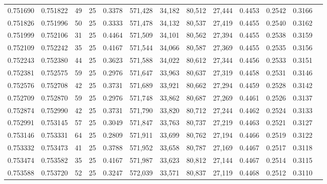 \begin{tabular}{rrrrrrrrrrrrr}
0.751690 & 0.751822 &    49 &  25 &                                     0.3378 & 571,428 &  34,182 &  80,512 &  27,444 & 0.4453 & 0.2542 & 0.3166 \\
0.751826 & 0.751996 &    50 &  25 &                                     0.3333 & 571,478 &  34,132 &  80,537 &  27,419 & 0.4455 & 0.2540 & 0.3162 \\
0.751999 & 0.752106 &    31 &  25 &                                     0.4464 & 571,509 &  34,101 &  80,562 &  27,394 & 0.4455 & 0.2538 & 0.3159 \\
0.752109 & 0.752242 &    35 &  25 &                                     0.4167 & 571,544 &  34,066 &  80,587 &  27,369 & 0.4455 & 0.2535 & 0.3156 \\
0.752243 & 0.752380 &    44 &  25 &                                     0.3623 & 571,588 &  34,022 &  80,612 &  27,344 & 0.4456 & 0.2533 & 0.3151 \\
0.752381 & 0.752575 &    59 &  25 &                                     0.2976 & 571,647 &  33,963 &  80,637 &  27,319 & 0.4458 & 0.2531 & 0.3146 \\
0.752576 & 0.752708 &    42 &  25 &                                     0.3731 & 571,689 &  33,921 &  80,662 &  27,294 & 0.4459 & 0.2528 & 0.3142 \\
0.752709 & 0.752870 &    59 &  25 &                                     0.2976 & 571,748 &  33,862 &  80,687 &  27,269 & 0.4461 & 0.2526 & 0.3137 \\
0.752874 & 0.752990 &    42 &  25 &                                     0.3731 & 571,790 &  33,820 &  80,712 &  27,244 & 0.4462 & 0.2524 & 0.3133 \\
0.752991 & 0.753145 &    57 &  25 &                                     0.3049 & 571,847 &  33,763 &  80,737 &  27,219 & 0.4463 & 0.2521 & 0.3127 \\
0.753146 & 0.753331 &    64 &  25 &                                     0.2809 & 571,911 &  33,699 &  80,762 &  27,194 & 0.4466 & 0.2519 & 0.3122 \\
0.753332 & 0.753473 &    41 &  25 &                                     0.3788 & 571,952 &  33,658 &  80,787 &  27,169 & 0.4467 & 0.2517 & 0.3118 \\
0.753474 & 0.753582 &    35 &  25 &                                     0.4167 & 571,987 &  33,623 &  80,812 &  27,144 & 0.4467 & 0.2514 & 0.3115 \\
0.753588 & 0.753720 &    52 &  25 &                                     0.3247 & 572,039 &  33,571 &  80,837 &  27,119 & 0.4468 & 0.2512 & 0.3110 \\

\end{tabular}
